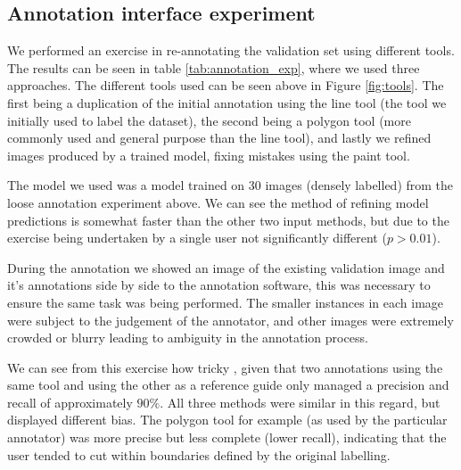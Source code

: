 \subsection {Annotation interface experiment}



We performed an exercise in re-annotating the validation set using different tools. The results can be seen in table \ref{tab:annotation_exp}, where we used three approaches. The different tools used can be seen above in Figure \ref{fig:tools}.  The first being a duplication of the initial annotation using the line tool (the tool we initially used to label the dataset), the second being a polygon tool (more commonly used and general purpose than the line tool), and lastly we refined images produced by a trained model, fixing mistakes using the paint tool.

The model we used was a model trained on 30 images (densely labelled) from the loose annotation experiment above. We can see the method of refining model predictions is somewhat faster than the other two input methods, but due to the exercise being undertaken by a single user not significantly different ($ p > 0.01 $).

During the annotation we showed an image of the existing validation image and it's annotations side by side to the annotation software, this was necessary to ensure the same task was being performed. The smaller instances in each image were subject to the judgement of the annotator, and other images were extremely crowded or blurry leading to ambiguity in the annotation process. 



We can see from this exercise how tricky , given that two annotations using the same tool and using the other as a reference guide only managed a precision and recall of approximately $ 90\% $. All three methods were similar in this regard, but displayed different bias. The polygon tool for example (as used by the particular annotator) was more precise but less complete (lower recall), indicating that the user tended to cut within boundaries defined by the original labelling. 




